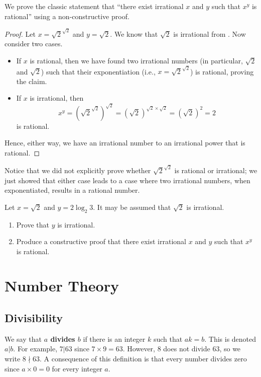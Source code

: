 \begin{example}
    We prove the classic statement that ``there exist irrational $x$ and $y$ such that $x^y$ is rational'' using a non-constructive proof.
    \begin{proof}
        Let $x = \sqrt2^{\sqrt2}$ and $y = \sqrt2$. We know that $\sqrt2$ is irrational from . Now consider two cases.
        \begin{itemize}
            \item If $x$ is rational, then we have found two irrational numbers (in particular, $\sqrt 2$ and $\sqrt 2$) such that their exponentiation (i.e.,  $x = \sqrt2^{\sqrt2}$) is rational, proving the claim.
            \item If $x$ is irrational, then \[x^y = \left(\sqrt2^{\sqrt2}\right)^{\sqrt2} = (\sqrt2)^{\sqrt2 \times \sqrt2} = (\sqrt2)^2 = 2\]
            is rational.
        \end{itemize}
        Hence, either way, we have an irrational number to an irrational power that is rational.
    \end{proof}
    Notice that we did not explicitly prove whether $\sqrt2^{\sqrt2}$ is rational or irrational; we just showed that either case leads to a case where two irrational numbers, when exponentiated, results in a rational number.
\end{example}

\begin{exercise}
    Let $x = \sqrt2$ and $y = 2\log_2{3}$. It may be assumed that $\sqrt2$ is irrational.
    \begin{enumerate}[label=(\roman*)]
        \item Prove that $y$ is irrational.
        \item Produce a constructive proof that there exist irrational $x$ and $y$ such that $x^y$ is rational.
    \end{enumerate}
\end{exercise}

\chapter{Number Theory}
\section{Divisibility}
We say that \textbf{$a$ divides $b$} if there is an integer $k$ such that $ak = b$. This is denoted $a\vert b$. For example, $7\vert 63$ since $7 \times 9 = 63$. However, 8 does not divide 63, so we write $8 \nmid 63$. A consequence of this definition is that every number divides zero since $a \times 0 = 0$ for every integer $a$.

